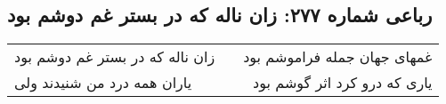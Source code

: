 \begin{center}
\section*{رباعی شماره ۲۷۷: زان ناله که در بستر غم دوشم بود}
\label{sec:sh277}
\begin{longtable}{l p{0.5cm} r}
زان ناله که در بستر غم دوشم بود
&&
غمهای جهان جمله فراموشم بود
\\
یاران همه درد من شنیدند ولی
&&
یاری که درو کرد اثر گوشم بود
\\
\end{longtable}
\end{center}
